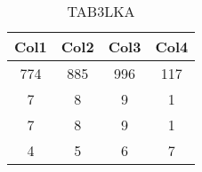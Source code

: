 \begin{table}[htbp]
\centering
\begin{tabular}{||c c c c||} 
 \hline
 Col1 & Col2 & Col3 & Col4 \\ [0.5ex] 
 \hline\hline
 774 & 885 & 996 & 117  \\
 \hline
 7   & 8   & 9   & 1  \\
 \hline
 7   & 8   & 9   & 1  \\
 \hline
 4   & 5   & 6   & 7  \\
 \hline
\end{tabular}
\label{tab:random_numbers}
\caption{TAB3LKA}
\end{table}